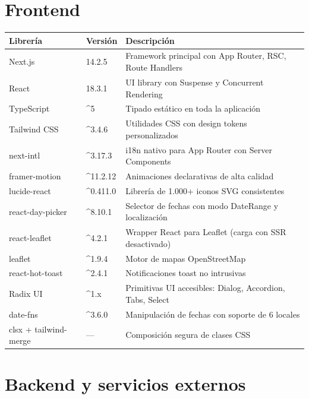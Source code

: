 \documentclass[12pt,a4paper,twoside,openright]{report}
\begin{document}
\section{Frontend}

\begin{longtable}{L{3.5cm} C{2cm} L{7cm}}
  \toprule
  \textbf{Librería} & \textbf{Versión} & \textbf{Descripción} \\
  \midrule
  Next.js & 14.2.5 & Framework principal con App Router, RSC, Route Handlers \\
  React & 18.3.1 & UI library con Suspense y Concurrent Rendering \\
  TypeScript & \textasciicircum 5 & Tipado estático en toda la aplicación \\
  Tailwind CSS & \textasciicircum 3.4.6 & Utilidades CSS con design tokens personalizados \\
  next-intl & \textasciicircum 3.17.3 & i18n nativo para App Router con Server Components \\
  framer-motion & \textasciicircum 11.2.12 & Animaciones declarativas de alta calidad \\
  lucide-react & \textasciicircum 0.411.0 & Librería de 1.000+ iconos SVG consistentes \\
  react-day-picker & \textasciicircum 8.10.1 & Selector de fechas con modo DateRange y localización \\
  react-leaflet & \textasciicircum 4.2.1 & Wrapper React para Leaflet (carga con SSR desactivado) \\
  leaflet & \textasciicircum 1.9.4 & Motor de mapas OpenStreetMap \\
  react-hot-toast & \textasciicircum 2.4.1 & Notificaciones toast no intrusivas \\
  Radix UI & \textasciicircum 1.x & Primitivas UI accesibles: Dialog, Accordion, Tabs, Select \\
  date-fns & \textasciicircum 3.6.0 & Manipulación de fechas con soporte de 6 locales \\
  clsx + tailwind-merge & --- & Composición segura de clases CSS \\
  \bottomrule
\end{longtable}

\section{Backend y servicios externos}
\end{document}
